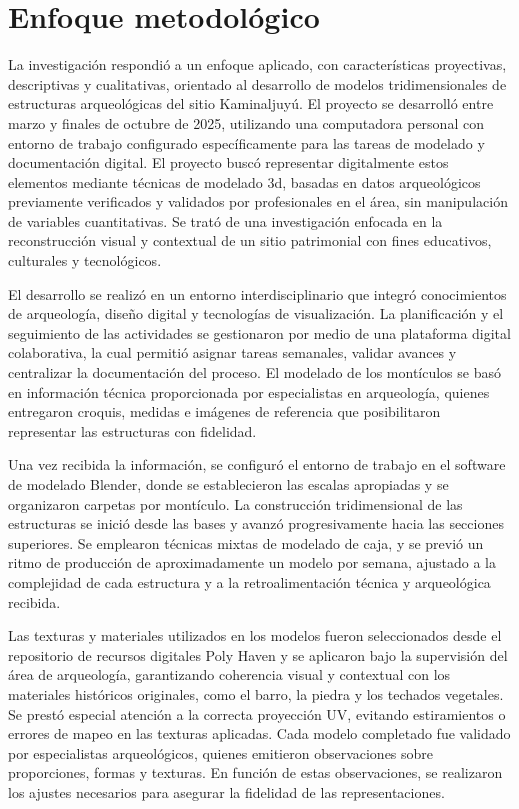 
\section{Enfoque metodológico}
La investigación respondió a un enfoque aplicado, con características proyectivas, descriptivas y cualitativas, orientado al desarrollo de modelos tridimensionales de estructuras arqueológicas del sitio Kaminaljuyú. El proyecto se desarrolló entre marzo y finales de octubre de 2025, utilizando una computadora personal con entorno de trabajo configurado específicamente para las tareas de modelado y documentación digital. El proyecto buscó representar digitalmente estos elementos mediante técnicas de modelado \gls{3d}, basadas en datos arqueológicos previamente verificados y validados por profesionales en el área, sin manipulación de variables cuantitativas. Se trató de una investigación enfocada en la reconstrucción visual y contextual de un sitio patrimonial con fines educativos, culturales y tecnológicos.

El desarrollo se realizó en un entorno interdisciplinario que integró conocimientos de arqueología, diseño digital y tecnologías de visualización. La planificación y el seguimiento de las actividades se gestionaron por medio de una plataforma digital colaborativa, la cual permitió asignar tareas semanales, validar avances y centralizar la documentación del proceso. El modelado de los montículos se basó en información técnica proporcionada por especialistas en arqueología, quienes entregaron croquis, medidas e imágenes de referencia que posibilitaron representar las estructuras con fidelidad.

Una vez recibida la información, se configuró el entorno de trabajo en el software de modelado Blender, donde se establecieron las escalas apropiadas y se organizaron carpetas por montículo. La construcción tridimensional de las estructuras se inició desde las bases y avanzó progresivamente hacia las secciones superiores. Se emplearon técnicas mixtas de modelado de caja, y se previó un ritmo de producción de aproximadamente un modelo por semana, ajustado a la complejidad de cada estructura y a la retroalimentación técnica y arqueológica recibida.

Las texturas y materiales utilizados en los modelos fueron seleccionados desde el repositorio de recursos digitales Poly Haven y se aplicaron bajo la supervisión del área de arqueología, garantizando coherencia visual y contextual con los materiales históricos originales, como el barro, la piedra y los techados vegetales. Se prestó especial atención a la correcta proyección UV, evitando estiramientos o errores de mapeo en las texturas aplicadas. Cada modelo completado fue validado por especialistas arqueológicos, quienes emitieron observaciones sobre proporciones, formas y texturas. En función de estas observaciones, se realizaron los ajustes necesarios para asegurar la fidelidad de las representaciones.


